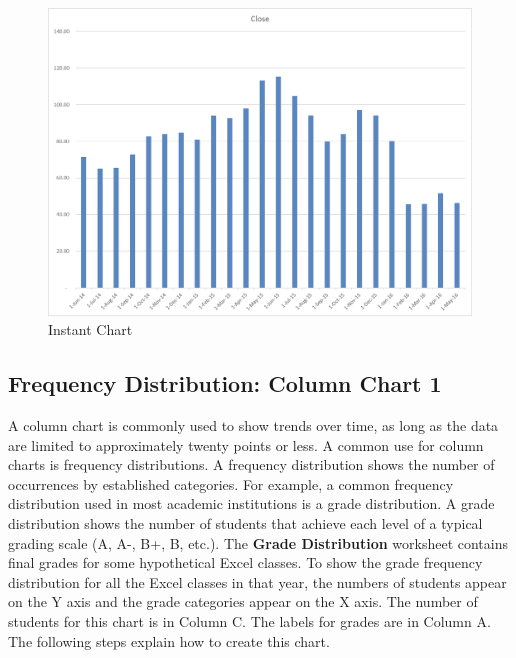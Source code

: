 \begin{figure}[H]
	\centering
	\includegraphics[width=\maxwidth{.95\linewidth}]{gfx/ch04_fig12}
	\caption{Instant Chart}
	\label{04:fig12}
\end{figure}

\subsection{Frequency Distribution: Column Chart 1}

A column chart is commonly used to show trends over time, as long as the data are limited to approximately twenty points or less. A common use for column charts is frequency distributions. A frequency distribution shows the number of occurrences by established categories. For example, a common frequency distribution used in most academic institutions is a grade distribution. A grade distribution shows the number of students that achieve each level of a typical grading scale (A, A-, B+, B, etc.). The \textbf{Grade Distribution} worksheet contains final grades for some hypothetical Excel classes. To show the grade frequency distribution for all the Excel classes in that year, the numbers of students appear on the Y axis and the grade categories appear on the X axis. The number of students for this chart is in Column C. The labels for grades are in Column A. The following steps explain how to create this chart.

